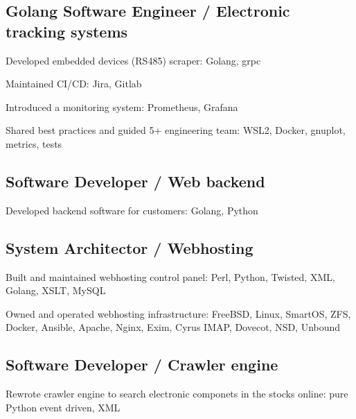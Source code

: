\documentclass[letter,10pt]{article}
\begin{document}
\subsection{{Golang Software Engineer / Electronic tracking systems}}
\begin{zitemize}
\item Developed embedded devices (RS485) scraper: Golang, grpc
\item Maintained CI/CD: Jira, Gitlab
\item Introduced a monitoring system: Prometheus, Grafana
\item Shared best practices and guided 5+ engineering team: WSL2, Docker, gnuplot, metrics, tests
\end{zitemize}

\subsection{{Software Developer / Web backend}}
\begin{zitemize}
\item Developed backend software for customers: Golang, Python
\end{zitemize}

\subsection{{System Architector / Webhosting}}
\begin{zitemize}
\item Built and maintained webhosting control panel: Perl, Python, Twisted, XML, Golang, XSLT, MySQL
\item Owned and operated webhosting infrastructure: FreeBSD, Linux, SmartOS, ZFS, Docker, Ansible, Apache, Nginx, Exim, Cyrus IMAP, Dovecot, NSD, Unbound
\end{zitemize}

\subsection{{Software Developer / Crawler engine}}
\begin{zitemize}
\item Rewrote crawler engine to search electronic componets in the stocks online: pure Python event driven, XML
\end{zitemize}
\end{document}
